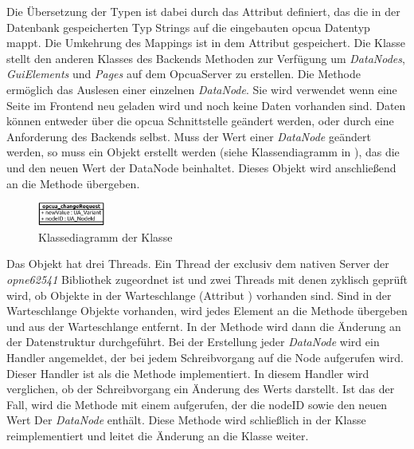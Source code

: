 Die Übersetzung der Typen ist dabei durch das Attribut  definiert, das die in der Datenbank gespeicherten Typ Strings auf die eingebauten \ac{opcua} Datentyp mappt.
Die Umkehrung des Mappings ist in dem Attribut  gespeichert.
Die Klasse  stellt den anderen Klasses des Backends Methoden zur Verfügung um \emph{DataNodes}, \emph{GuiElements} und \emph{Pages} auf dem OpcuaServer zu erstellen.
Die Methode  ermöglich das Auslesen einer einzelnen \emph{DataNode}. Sie wird verwendet wenn eine Seite im Frontend neu geladen wird und noch keine Daten vorhanden sind.
Daten können entweder über die \ac{opcua} Schnittstelle geändert werden, oder durch eine Anforderung des Backends selbst.
Muss der Wert einer \emph{DataNode} geändert werden, so muss ein  Objekt erstellt werden (siehe Klassendiagramm in ), 
das die  und den neuen Wert der DataNode beinhaltet. Dieses Objekt wird anschließend an die Methode  übergeben.
\begin{figure}[ht]
  \centering
  \includegraphics[width=0.2\textwidth]{content/hauptteil/umsetzungPoC/backend/uml/classesOfOverview/opcua_changeRequest.pdf}
  \caption{Klassediagramm der Klasse }
  \label{fig:backend:classDiag:opcuaCR}
\end{figure}
Das  Objekt hat drei Threads. Ein Thread der exclusiv dem nativen Server der \emph{opne62541} Bibliothek zugeordnet ist und zwei Threads mit denen zyklisch geprüft wird, 
ob  Objekte in der Warteschlange (Attribut ) vorhanden sind.
Sind in der Warteschlange  Objekte vorhanden, wird jedes Element an die Methode  übergeben und aus der Warteschlange entfernt.
In der Methode  wird dann die Änderung an der Datenstruktur durchgeführt.%
Bei der Erstellung jeder \emph{DataNode} wird ein Handler angemeldet, der bei jedem Schreibvorgang auf die Node aufgerufen wird.
Dieser Handler ist als die Methode  implementiert.
In diesem Handler wird verglichen, ob der Schreibvorgang ein Änderung des Werts darstellt. Ist das der Fall, wird die Methode  mit einem  aufgerufen, der die nodeID sowie den neuen Wert Der \emph{DataNode} enthält.
Diese Methode wird schließlich in der  Klasse reimplementiert und leitet die Änderung an die  Klasse weiter. 
